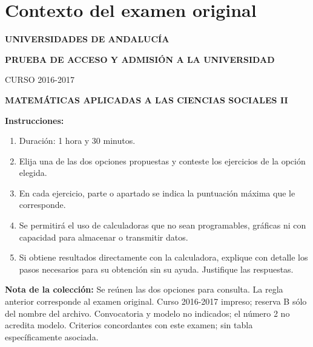 \section*{Contexto del examen original}
\textbf{UNIVERSIDADES DE ANDALUCÍA}\par
\textbf{PRUEBA DE ACCESO Y ADMISIÓN A LA UNIVERSIDAD}\par
CURSO 2016-2017\par
\textbf{MATEMÁTICAS APLICADAS A LAS CIENCIAS SOCIALES II}

\textbf{Instrucciones:}
\begin{enumerate}[label=\textbf{\alph*)}]
  \item Duración: 1 hora y 30 minutos.
  \item Elija una de las dos opciones propuestas y conteste los ejercicios de la opción elegida.
  \item En cada ejercicio, parte o apartado se indica la puntuación máxima que le corresponde.
  \item Se permitirá el uso de calculadoras que no sean programables, gráficas ni con capacidad para almacenar o transmitir datos.
  \item Si obtiene resultados directamente con la calculadora, explique con detalle los pasos necesarios para su obtención sin su ayuda. Justifique las respuestas.
\end{enumerate}
\noindent\textbf{Nota de la colección:} Se reúnen las dos opciones para consulta.
La regla anterior corresponde al examen original. Curso 2016-2017 impreso; reserva B sólo del nombre del archivo. Convocatoria y modelo no indicados; el número 2 no acredita modelo. Criterios concordantes con este examen; sin tabla específicamente asociada.
\par\medskip
